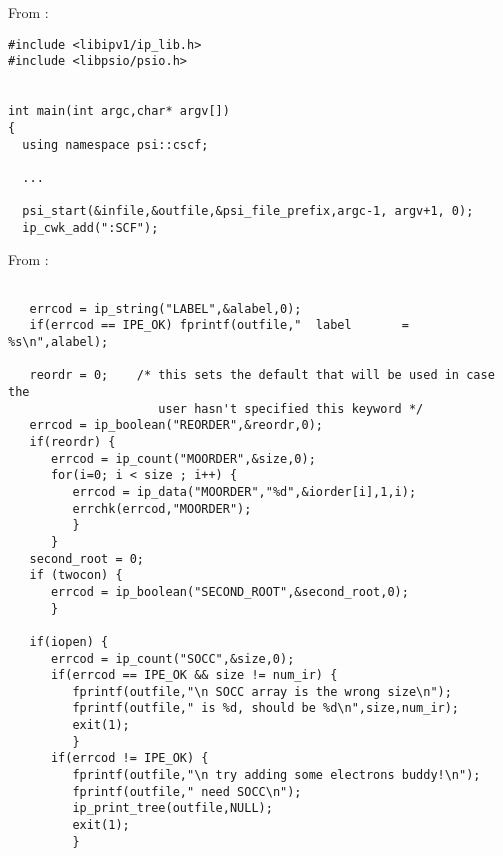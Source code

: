From :
\begin{verbatim}
#include <libipv1/ip_lib.h>
#include <libpsio/psio.h>


int main(int argc,char* argv[])
{
  using namespace psi::cscf;

  ...

  psi_start(&infile,&outfile,&psi_file_prefix,argc-1, argv+1, 0);
  ip_cwk_add(":SCF");
\end{verbatim}

From :
\begin{verbatim}

   errcod = ip_string("LABEL",&alabel,0);
   if(errcod == IPE_OK) fprintf(outfile,"  label       = %s\n",alabel);

   reordr = 0;    /* this sets the default that will be used in case the
                     user hasn't specified this keyword */
   errcod = ip_boolean("REORDER",&reordr,0); 
   if(reordr) {
      errcod = ip_count("MOORDER",&size,0);
      for(i=0; i < size ; i++) {
         errcod = ip_data("MOORDER","%d",&iorder[i],1,i);
         errchk(errcod,"MOORDER");
         }
      }
   second_root = 0;
   if (twocon) {
      errcod = ip_boolean("SECOND_ROOT",&second_root,0);
      }

   if(iopen) {
      errcod = ip_count("SOCC",&size,0);
      if(errcod == IPE_OK && size != num_ir) {
         fprintf(outfile,"\n SOCC array is the wrong size\n");
         fprintf(outfile," is %d, should be %d\n",size,num_ir);
         exit(1);
         }
      if(errcod != IPE_OK) {
         fprintf(outfile,"\n try adding some electrons buddy!\n");
         fprintf(outfile," need SOCC\n");
         ip_print_tree(outfile,NULL);
         exit(1);
         }
\end{verbatim}

